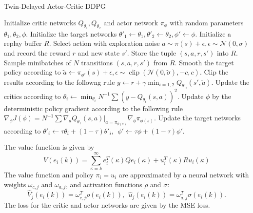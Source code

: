 \documentclass[portrait,fontscale=0.292,paperheight=48in,paperwidth=36in]{baposter}
\DeclareMathOperator{\Clip}{clip}
\begin{document}
\begin{poster}
{
	\begin{algorithm}[H]
		\caption{Twin-Delayed Actor-Critic DDPG}
		\begin{algorithmic}[1]
			\STATE Initialize critic networks $Q_{\theta_1}, Q_{\theta_2}$ and actor network $\pi_{\phi}$ with random parameters
			$\theta_1, \theta_2, \phi$. 
			\STATE Initialize the target networks $\theta'_1 \leftarrow \theta_1, \theta'_2 \leftarrow \theta_2, \phi' \leftarrow \phi$.
			\STATE Initialize a replay buffer $R$.
				\STATE Select action with exploration noise $a \sim \pi(s) + \epsilon, \epsilon \sim \mathcal{N}(0, \sigma)$ and record the reward $r$ and new state $s'$. 
				\STATE Store the tuple $(s, a, r, s')$ into $R$. 
				\STATE Sample minibatches of $N$ transitions $(s, a, r, s')$ from $R$.
				\STATE Smooth the target policy according to $\tilde{a} \leftarrow \pi_{\phi'}(s) + \epsilon, \epsilon \sim \Clip(\mathcal{N}(0, \tilde{\sigma}), -c, c)$.
				\STATE Clip the results according to the followng rule $y \leftarrow r + \gamma \min_{i=1,2}Q_{\theta'_i}(s', \tilde{a})$. 
				\STATE Update the critics according to $\theta_i \leftarrow \min_{\theta_i}N^{-1}\sum(y - Q_{\theta_i}(s, a))^2$.
					\STATE Update $\phi$ by the deterministic policy gradient according to the following rule $\nabla_{\phi}J(\phi) = N^{-1}\sum\nabla_a Q_{\theta_1}(s,a)\big|_{a = \pi_{\phi(s)}}\nabla_{\phi}\pi_{\phi(s)}$.
					\STATE Update the target networks according to $\theta'_i \leftarrow \tau\theta_i + (1-\tau)\theta'_i, \:\: \phi' \leftarrow \tau\phi + (1-\tau)\phi'$.
				\ENDIF 
			\ENDFOR
		\end{algorithmic}	
	\end{algorithm}
	\vspace{-0.8em}
	The value function is given by
	\begin{equation*}
		\displaystyle V(e_i(k)) = \sum\limits_{\kappa = k}^{\infty}{e_i^T(\kappa)Qe_i(\kappa) + u_i^T(\kappa)Ru_i(\kappa)}
	\end{equation*}
	The value function and policy $\pi_i = u_i$ are approximated by a neural network with weights $\omega_{c, j}$ and $\omega_{a,j}$, and activation functions $\rho$ and $\sigma$:
	\begin{equation*}
		\displaystyle \widehat{V}_j(e_i(k)) = \omega_{c, j}^T\rho(e_i(k)), \:\: \widehat{u}_j(e_i(k)) = \omega_{a,j}^T\sigma(e_i(k)).
	\end{equation*}
	The loss for the critic and actor networks are given by the MSE loss. 
}


\end{poster}
\end{document}
